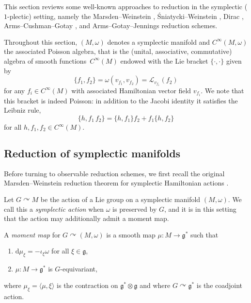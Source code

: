 \documentclass[10pt,a4paper]{amsart}
\numberwithin{equation}{section}
\DeclareMathOperator{\action}{\curvearrowright}
\newcommand{\g}{\mathfrak{g}}
\renewcommand{\L}{\mathscr{L}}
\renewcommand{\d}{\mathrm{d}}
\begin{document}
This section reviews some well-known approaches to reduction in the symplectic ($1$-plectic) setting, namely the Marsden--Weinstein \cite{MarsdenWeinstein74},  \'Sniatycki--Weinstein \cite{SniatyckiWeinstein83}, Dirac \cite{Dirac64}, Arms--Cush\-man--Gotay \cite{ArmsCushmanGotay91}, and Arms--Gotay--Jennings \cite{ArmsGotayJennings90} reduction schemes.


Throughout this section, $(M,\omega)$ denotes a symplectic manifold and $C^\infty(M,\omega)$ the associated Poisson algebra, that is the (unital, associative, commutative) algebra of smooth func\-tions~$C^\infty(M)$ endowed with the Lie bracket $\{\cdot,\cdot\}$ given by
\[
	\{f_1,f_2\} = \omega( v_{f_1}, v_{f_2})
	= \L_{ v_{f_1}} (f_2)
\]
for any $f_i\in C^\infty(M)$ with associated Hamiltonian vector field $v_{f_i}$.
We note that this bracket is indeed Poisson: in addition to the Jacobi identity it satisfies the Leibniz rule,
\[
	\{h, f_1\,f_2 \} = \{h,f_1\}f_2 + f_1\{h,f_2\}
\]
for all $h,f_1,f_2 \in C^\infty(M)$.


\subsection{Reduction of symplectic manifolds}%

Before turning to observable reduction schemes, we first recall the original Marsden--Weinstein reduction theorem for symplectic Hamiltonian actions \cite{MarsdenWeinstein74}.

Let $G\action M$ be the action of a Lie group on a symplectic manifold $(M,\omega)$. We call this a \emph{symplectic action} when $\omega$ is preserved by $G$,
and it is in this setting that the action may additionally admit a moment map.


\begin{Definition}\label{def:momentmap}
	A \emph{moment map} for $G\action(M,\omega)$ is a smooth map $\mu\colon M\to \mathfrak{g}^\ast$ such that
		\begin{enumerate}\itemsep=0pt
			\item[(i)] $\d\mu_\xi= -\iota_\xi\omega$ for all $\xi\in\g$,
			\item[(ii)] $\mu\colon M\to\g^*$ is $G$-equivariant,
		\end{enumerate}
		where $\mu_\xi=\langle\mu,\xi\rangle$ is the contraction on $\g^*\otimes\g$ and where $G\curvearrowright\g^*$ is the coadjoint action.
\end{Definition}
\end{document}
